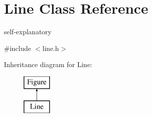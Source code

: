 \hypertarget{class_line}{}\section{Line Class Reference}
\label{class_line}


self-\/explanatory  




{\ttfamily \#include $<$line.\+h$>$}

Inheritance diagram for Line\+:\begin{figure}[H]
\begin{center}
\leavevmode
\includegraphics[height=2.000000cm]{class_line}
\end{center}
\end{figure}
